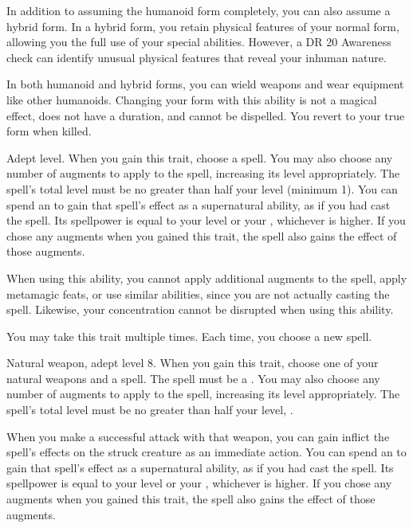     In addition to assuming the humanoid form completely, you can also assume a hybrid form.
    In a hybrid form, you retain physical features of your normal form, allowing you the full use of your special abilities.
    However, a DR 20 Awareness check can identify unusual physical features that reveal your inhuman nature.

    In both humanoid and hybrid forms, you can wield weapons and wear equipment like other humanoids.
    Changing your form with this ability is not a magical effect, does not have a duration, and cannot be dispelled.
    You revert to your true form when killed.

    \featpre Adept level.
    \featben When you gain this trait, choose a spell.
    You may also choose any number of augments to apply to the spell, increasing its level appropriately.
    The spell's total level must be no greater than half your level (minimum 1).
    You can spend an  to gain that spell's effect as a supernatural ability, as if you had cast the spell.
    Its spellpower is equal to your level or your , whichever is higher.
    If you chose any augments when you gained this trait, the spell also gains the effect of those augments.

    When using this ability, you cannot apply additional augments to the spell, apply metamagic feats, or use similar abilities, since you are not actually casting the spell.
    Likewise, your concentration cannot be disrupted when using this ability.

     You may take this trait multiple times.
    Each time, you choose a new spell.

    \featpres Natural weapon, adept level 8.
    \featben When you gain this trait, choose one of your natural weapons and a spell.
    The spell must be a .
    You may also choose any number of augments to apply to the spell, increasing its level appropriately.
    The spell's total level must be no greater than half your level, .

    When you make a successful attack with that weapon, you can gain inflict the spell's effects on the struck creature as an immediate action.
    You can spend an  to gain that spell's effect as a supernatural ability, as if you had cast the spell.
    Its spellpower is equal to your level or your , whichever is higher.
    If you chose any augments when you gained this trait, the spell also gains the effect of those augments.

